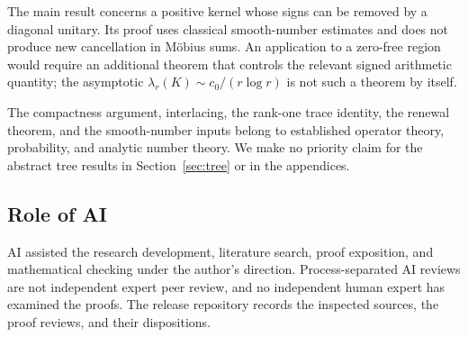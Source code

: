 \begin{remark}
The main result concerns a positive kernel whose signs can be removed by
a diagonal unitary. Its proof uses classical smooth-number estimates and
does not produce new cancellation in M\"obius sums. An application to a
zero-free region would require an additional theorem that controls the
relevant signed arithmetic quantity; the asymptotic
$\lambda_r(K)\sim c_0/(r\log r)$ is not such a theorem by itself.
\end{remark}

\begin{remark}[Attribution]
The compactness argument, interlacing, the rank-one trace identity, the
renewal theorem, and the smooth-number inputs belong to established
operator theory, probability, and analytic number theory. We make no
priority claim for the abstract tree results in Section~\ref{sec:tree}
or in the appendices.
\end{remark}

\subsection*{Role of AI}
AI assisted the research development, literature search, proof exposition,
and mathematical checking under the author's direction. Process-separated
AI reviews are not independent expert peer review, and no independent human
expert has examined the proofs. The release repository records the
inspected sources, the proof reviews, and their dispositions.
